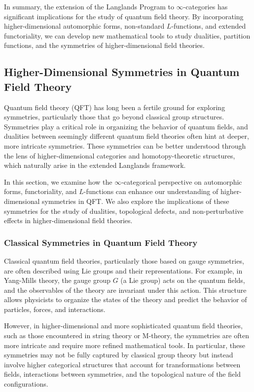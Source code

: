 \documentclass{article}
\theoremstyle{remark}
\begin{document}
In summary, the extension of the Langlands Program to $\infty$-categories has significant implications for the study of quantum field theory. By incorporating higher-dimensional automorphic forms, non-standard $L$-functions, and extended functoriality, we can develop new mathematical tools to study dualities, partition functions, and the symmetries of higher-dimensional field theories.

\subsection{Higher-Dimensional Symmetries in Quantum Field Theory}

Quantum field theory (QFT) has long been a fertile ground for exploring symmetries, particularly those that go beyond classical group structures. Symmetries play a critical role in organizing the behavior of quantum fields, and dualities between seemingly different quantum field theories often hint at deeper, more intricate symmetries. These symmetries can be better understood through the lens of higher-dimensional categories and homotopy-theoretic structures, which naturally arise in the extended Langlands framework.

In this section, we examine how the $\infty$-categorical perspective on automorphic forms, functoriality, and $L$-functions can enhance our understanding of higher-dimensional symmetries in QFT. We also explore the implications of these symmetries for the study of dualities, topological defects, and non-perturbative effects in higher-dimensional field theories.

\subsubsection{Classical Symmetries in Quantum Field Theory}

Classical quantum field theories, particularly those based on gauge symmetries, are often described using Lie groups and their representations. For example, in Yang-Mills theory, the gauge group $G$ (a Lie group) acts on the quantum fields, and the observables of the theory are invariant under this action. This structure allows physicists to organize the states of the theory and predict the behavior of particles, forces, and interactions.

However, in higher-dimensional and more sophisticated quantum field theories, such as those encountered in string theory or M-theory, the symmetries are often more intricate and require more refined mathematical tools. In particular, these symmetries may not be fully captured by classical group theory but instead involve higher categorical structures that account for transformations between fields, interactions between symmetries, and the topological nature of the field configurations.
\end{document}
